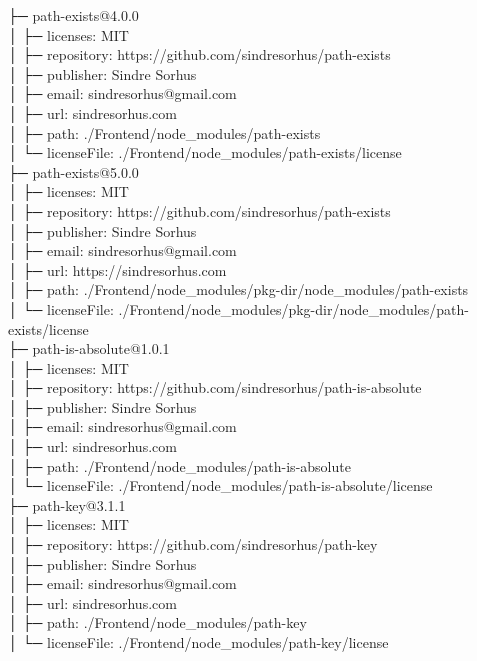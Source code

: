 ├─ path-exists@4.0.0\\
│  ├─ licenses: MIT\\
│  ├─ repository: https://github.com/sindresorhus/path-exists\\
│  ├─ publisher: Sindre Sorhus\\
│  ├─ email: sindresorhus@gmail.com\\
│  ├─ url: sindresorhus.com\\
│  ├─ path: ./Frontend/node\_modules/path-exists\\
│  └─ licenseFile: ./Frontend/node\_modules/path-exists/license\\
├─ path-exists@5.0.0\\
│  ├─ licenses: MIT\\
│  ├─ repository: https://github.com/sindresorhus/path-exists\\
│  ├─ publisher: Sindre Sorhus\\
│  ├─ email: sindresorhus@gmail.com\\
│  ├─ url: https://sindresorhus.com\\
│  ├─ path: ./Frontend/node\_modules/pkg-dir/node\_modules/path-exists\\
│  └─ licenseFile: ./Frontend/node\_modules/pkg-dir/node\_modules/path-exists/license\\
├─ path-is-absolute@1.0.1\\
│  ├─ licenses: MIT\\
│  ├─ repository: https://github.com/sindresorhus/path-is-absolute\\
│  ├─ publisher: Sindre Sorhus\\
│  ├─ email: sindresorhus@gmail.com\\
│  ├─ url: sindresorhus.com\\
│  ├─ path: ./Frontend/node\_modules/path-is-absolute\\
│  └─ licenseFile: ./Frontend/node\_modules/path-is-absolute/license\\
├─ path-key@3.1.1\\
│  ├─ licenses: MIT\\
│  ├─ repository: https://github.com/sindresorhus/path-key\\
│  ├─ publisher: Sindre Sorhus\\
│  ├─ email: sindresorhus@gmail.com\\
│  ├─ url: sindresorhus.com\\
│  ├─ path: ./Frontend/node\_modules/path-key\\
│  └─ licenseFile: ./Frontend/node\_modules/path-key/license\\
